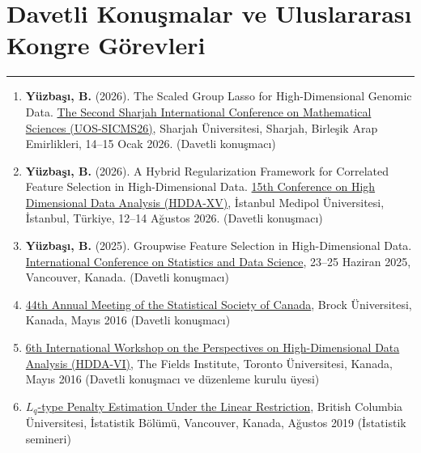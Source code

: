 \documentclass[10pt,a4paper]{article}
\newcommand{\NewPart}[2]{%
	\Needspace{7\baselineskip}%
	\vspace{0.45em}%
	\section*{\sffamily\large\bfseries\color{MidnightBlue}#1 #2}%
	\vspace{-0.7em}\noindent\color{MidnightBlue}\rule{\textwidth}{0.55pt}\color{Black}\vspace{0.25em}}
\newcommand{\TalkEntry}[4]{
		\noindent #1, #2, #3 #4}
\newenvironment{etaremune}{\begin{enumerate}}{\end{enumerate}}
\begin{document}
\NewPart{Davetli Konuşmalar ve Uluslararası Kongre Görevleri}{}
\begin{etaremune}
\renewcommand{\theenumi}{C1-\arabic{enumi}}


\item {\bf Y\"{u}zba\c{s}{\i}, B.} (2026). The Scaled Group Lasso for High-Dimensional Genomic Data. \href{https://www.sharjah.ac.ae/Conferences/SICMS26}{The Second Sharjah International Conference on Mathematical Sciences (UOS-SICMS26)}, Sharjah Üniversitesi, Sharjah, Birleşik Arap Emirlikleri, 14--15 Ocak 2026. (Davetli konuşmacı)

\item {\bf Y\"{u}zba\c{s}{\i}, B.} (2026). A Hybrid Regularization Framework for Correlated Feature Selection in High-Dimensional Data. \href{https://hdda2026.medipol.edu.tr}{15th Conference on High Dimensional Data Analysis (HDDA-XV)}, İstanbul Medipol Üniversitesi, İstanbul, Türkiye, 12--14 Ağustos 2026. (Davetli konuşmacı)

\item {\bf Y\"{u}zba\c{s}{\i}, B.} (2025). Groupwise Feature Selection in High-Dimensional Data. \href{https://icsds.github.io/2025/assets/program_ICSDS2025.pdf}{International Conference on Statistics and Data Science}, 23--25 Haziran 2025, Vancouver, Kanada. (Davetli konuşmacı)

\item\TalkEntry{\href{https://ssc.ca/en/2016-some-applications-james-stein-shrinkage-estimation\#by}{44th Annual Meeting of the Statistical Society of Canada}}{Brock Üniversitesi, Kanada}{Mayıs 2016}{(Davetli konuşmacı)} 

\item\TalkEntry{\href{http://www.fields.utoronto.ca/talks/stein-type-generalized-ridge-regression-high-dimensional-sparse-models}{6th International Workshop on the Perspectives on High-Dimensional
Data Analysis (HDDA-VI)}}{The Fields Institute, Toronto Üniversitesi, Kanada}{Mayıs 2016}{(Davetli konuşmacı ve düzenleme kurulu üyesi)} 


\item\TalkEntry{\href{https://www.stat.ubc.ca/events-list?field_event_type_tid=All&page=5&year=2005}{$L_q$-type Penalty Estimation Under the Linear Restriction}}{British Columbia Üniversitesi, İstatistik Bölümü, Vancouver, Kanada}{Ağustos 2019}{(İstatistik semineri)} 



\end{etaremune}
\end{document}
